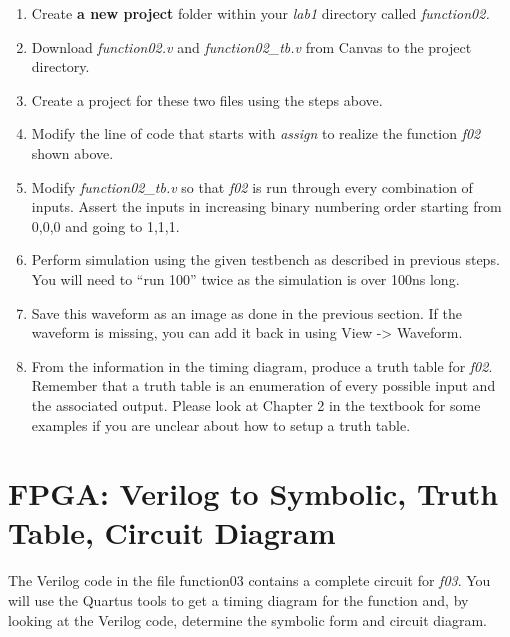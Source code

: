 \begin{enumerate}
        \def\labelenumi{\arabic{enumi}.}
    \item
        Create \textbf{a new project} folder within your \emph{lab1} directory
        called \emph{function02.}
    \item
        Download \emph{function02.v} and \emph{function02\_tb.v} from Canvas
        to the project directory.
    \item
        Create a project for these two files using the steps above.
    \item
        \protect\hypertarget{Part_2_Step_4}{}{}Modify the line of code that
        starts with \emph{assign} to realize the function \emph{f02} shown
        above.
    \item
        Modify \emph{function02\_tb.v} so that \emph{f02} is run through every
        combination of inputs. Assert the inputs in increasing binary
        numbering order starting from 0,0,0 and going to 1,1,1.
    \item
        Perform simulation using the given testbench as described in previous
        steps. You will need to ``run 100'' twice as the simulation is over
        100ns long.
    \item
        \protect\hypertarget{Part_2_Step_7}{}{}Save this waveform as an image
        as done in the previous section. If the waveform is missing, you can
        add it back in using View -\textgreater{} Waveform.
    \item
        \protect\hypertarget{Part_2_Step_8}{}{}From the information in the
        timing diagram, produce a truth table for \emph{f02}. Remember that a
        truth table is an enumeration of every possible input and the
        associated output. Please look at Chapter 2 in the textbook for some
        examples if you are unclear about how to setup a truth table.
\end{enumerate}

\section{FPGA: Verilog to Symbolic, Truth Table, Circuit Diagram}

The Verilog code in the file function03 contains a complete circuit for
\emph{f03}. You will use the Quartus tools to get a timing diagram for
the function and, by looking at the Verilog code, determine the symbolic
form and circuit diagram.

